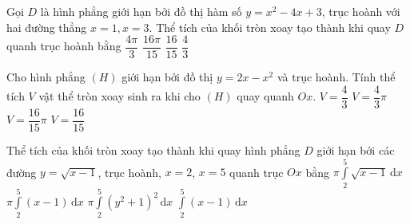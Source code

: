 \begin{ex}%
	Gọi $ D $ là hình phẳng giới hạn bởi đồ thị hàm số $ y=x^2-4x+3 $, trục hoành với hai đường thẳng $ x=1,x=3 $. Thể tích của khối tròn xoay tạo thành khi quay $ D $ quanh trục hoành bằng
	\choice
	{$ \dfrac{4\pi}{3} $}
	{\True $ \dfrac{16\pi}{15} $}
	{$ \dfrac{16}{15} $}
	{$ \dfrac{4}{3} $}
	\end{ex}

\begin{ex}%
	Cho hình phẳng $(H)$ giới hạn bởi đồ thị $y=2x-x^2$ và trục hoành. Tính thể tích $V$ vật thể tròn xoay sinh ra khi cho $(H)$ quay quanh $Ox$.
	\choice
	{$V=\dfrac{4}{3}$}
	{$V=\dfrac{4}{3}\pi$}
	{\True $V=\dfrac{16}{15}\pi$}
	{$V=\dfrac{16}{15}$}
\end{ex} 

\begin{ex}%
	Thể tích của khối tròn xoay tạo thành khi quay hình phẳng $ D $	giới hạn bởi các đường $ y = \sqrt{x-1} $, trục hoành, $ x = 2 $, $ x = 5 $ quanh trục $ Ox $ bằng
	\choice
	{$ \pi\displaystyle\int\limits_2^5 \sqrt{x-1} \mathrm{\,d}x $}
	{\True $ \pi\displaystyle \int\limits_2^5 \left(x-1\right) \mathrm{\,d}x $}
	{$ \pi\displaystyle\int\limits_2^5 \left(y^2+1\right)^2 \mathrm{\,d}x $}
	{$ \displaystyle\int\limits_2^5 \left(x-1\right) \mathrm{\,d}x $ }
\end{ex}

